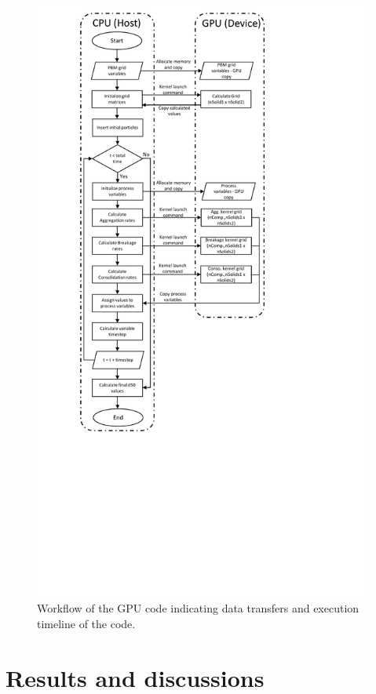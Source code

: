 \documentclass[review]{elsarticle}
\begin{document}
\begin{linenumbers}
\newpage
\begin{figure}[th]
\centering
\includegraphics[scale=0.8,trim=200 250 300 200]{Figure_2.pdf}
\caption{Workflow of the GPU code indicating data transfers and execution timeline of the code.}
\label{fig:mtd_gpu_imp}
\end{figure}


\newpage
\section{Results and discussions}
\label{secResults}

\end{linenumbers}
\end{document}
